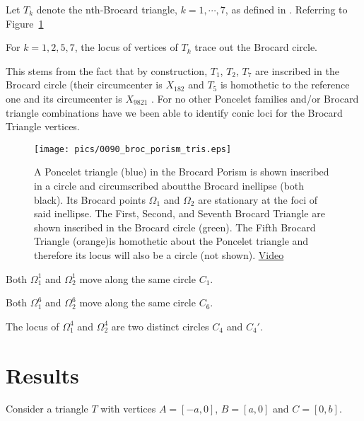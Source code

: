 Let $T_k$ denote the nth-Brocard triangle, $k=1,\cdots,7$, as defined in  \cite{gibert2020-brocard}. Referring to Figure~\ref{fig:broc-por-tris}

\begin{remark}
For $k=1,2,5,7$, the locus of vertices of $T_k$ trace out the Brocard circle.
\end{remark}

This stems from the fact that by construction, $T_1$, $T_2$, $T_7$ are inscribed in the Brocard circle (their circumcenter is $X_{182}$ and $T_5$ is homothetic to the reference one and its circumcenter is $X_{9821}$ \cite{etc}. For no other Poncelet families and/or Brocard triangle combinations have we been able to identify conic loci for the Brocard Triangle vertices.

\begin{figure}
    \centering
    \texttt{[image: pics/0090\_broc\_porism\_tris.eps]}
    \caption{A Poncelet triangle (blue) in the Brocard Porism is shown inscribed in a circle and circumscribed aboutthe Brocard inellipse (both black). Its Brocard points $\Omega_1$ and $\Omega_2$ are stationary at the foci of said inellipse. The First, Second, and Seventh Brocard Triangle are shown inscribed in the Brocard circle (green). The Fifth Brocard Triangle (orange)is homothetic about the Poncelet triangle and therefore its locus will also be a circle (not shown). \href{bit.ly}{Video}}
    \label{fig:broc-por-tris}
\end{figure}

\begin{observation}
Both $\Omega_1^1$ and $\Omega_2^1$
move along the same circle $C_1$.
\end{observation}

\begin{observation}
Both $\Omega_1^6$ and $\Omega_2^6$
move along the same circle $C_6$.
\end{observation}

\begin{observation}
The locus of $\Omega_1^4$ and $\Omega_2^4$ are two distinct circles $C_4$ and $C_4'$.
\end{observation}

\section{ Results}

Consider a triangle $T$ with vertices $A=[-a,0]$, $B=[a,0]$ and
$C=[0,b]$.

